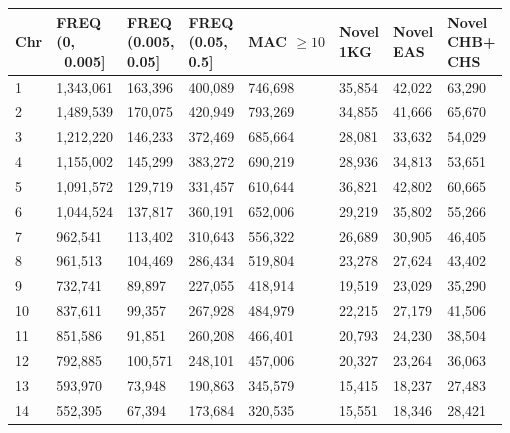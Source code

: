 \begin{table}[!ht]
    \centering
    \begin{tabular}{|l|l|l|l|l|l|l|l|}
    \hline
        Chr & \shortstack{FREQ\\ (0,\\\ 0.005]} & \shortstack{FREQ\\ (0.005,\\ 0.05]} & \shortstack{FREQ\\ (0.05,\\ 0.5]}  & \shortstack{MAC\\  $\ge 10$} & \shortstack{Novel\\ 1KG}& \shortstack{Novel\\ EAS} & 
        \shortstack{Novel\\ CHB+\\ CHS}\\ \hline
        1 & 1,343,061 & 163,396 & 400,089 & 746,698 & 35,854 & 42,022 & 63,290 \\ \hline
        2 & 1,489,539 & 170,075 & 420,949 & 793,269 & 34,855 & 41,666 & 65,670 \\ \hline
        3 & 1,212,220 & 146,233 & 372,469 & 685,664 & 28,081 & 33,632 & 54,029 \\ \hline
        4 & 1,155,002 & 145,299 & 383,272 & 690,219 & 28,936 & 34,813 & 53,651 \\ \hline
        5 & 1,091,572 & 129,719 & 331,457 & 610,644 & 36,821 & 42,802 & 60,665 \\ \hline
        6 & 1,044,524 & 137,817 & 360,191 & 652,006 & 29,219 & 35,802 & 55,266 \\ \hline
        7 & 962,541 & 113,402 & 310,643 & 556,322 & 26,689 & 30,905 & 46,405 \\ \hline
        8 & 961,513 & 104,469 & 286,434 & 519,804 & 23,278 & 27,624 & 43,402 \\ \hline
        9 & 732,741 & 89,897 & 227,055 & 418,914 & 19,519 & 23,029 & 35,290 \\ \hline
        10 & 837,611 & 99,357 & 267,928 & 484,979 & 22,215 & 27,179 & 41,506 \\ \hline
        11 & 851,586 & 91,851 & 260,208 & 466,401 & 20,793 & 24,230 & 38,504 \\ \hline
        12 & 792,885 & 100,571 & 248,101 & 457,006 & 20,327 & 23,264 & 36,063 \\ \hline
        13 & 593,970 & 73,948 & 190,863 & 345,579 & 15,415 & 18,237 & 27,483 \\ \hline
        14 & 552,395 & 67,394 & 173,684 & 320,535 & 15,551 & 18,346 & 28,421 \\ \hline

\end{tabular}
\end{table}
